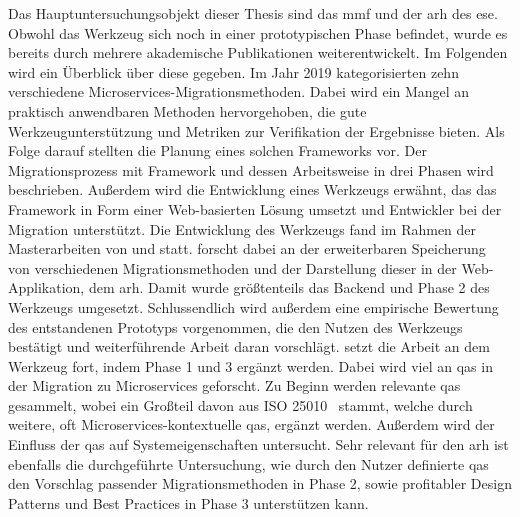 Das Hauptuntersuchungsobjekt dieser Thesis sind das \gls{mmf} und der \gls{arh} des \gls{ese}.
Obwohl das Werkzeug sich noch in einer prototypischen Phase befindet, wurde es bereits durch mehrere akademische Publikationen weiterentwickelt.
Im Folgenden wird ein Überblick über diese gegeben.
Im Jahr 2019 kategorisierten  zehn verschiedene Microservices-Migrationsmethoden.
Dabei wird ein Mangel an praktisch anwendbaren Methoden hervorgehoben, die gute Werkzeugunterstützung und Metriken zur Verifikation der Ergebnisse bieten.
Als Folge darauf stellten  die Planung eines solchen Frameworks vor.
Der Migrationsprozess mit Framework und dessen Arbeitsweise in drei Phasen wird beschrieben.
Außerdem wird die Entwicklung eines Werkzeugs erwähnt, das das Framework in Form einer Web-basierten Lösung umsetzt und Entwickler bei der Migration unterstützt.
Die Entwicklung des Werkzeugs fand im Rahmen der Masterarbeiten von  und  statt.
\citeauthor{master-tobias-haller} forscht dabei an der erweiterbaren Speicherung von verschiedenen Migrationsmethoden und der Darstellung dieser in der Web-Applikation, dem \gls{arh}.
Damit wurde größtenteils das Backend und Phase 2 des Werkzeugs umgesetzt.
Schlussendlich wird außerdem eine empirische Bewertung des entstandenen Prototyps vorgenommen, die den Nutzen des Werkzeugs bestätigt und weiterführende Arbeit daran vorschlägt.
 setzt die Arbeit an dem Werkzeug fort, indem Phase 1 und 3 ergänzt werden.
Dabei wird viel an \glspl{qa} in der Migration zu Microservices geforscht.
Zu Beginn werden relevante \glspl{qa} gesammelt, wobei ein Großteil davon aus ISO 25010~\cite{ISO-25010} stammt, welche durch weitere, oft Microservices-kontextuelle \glspl{qa}, ergänzt werden.
Außerdem wird der Einfluss der \glspl{qa} auf Systemeigenschaften untersucht.
Sehr relevant für den \gls{arh} ist ebenfalls die durchgeführte Untersuchung, wie durch den Nutzer definierte \glspl{qa} den Vorschlag passender Migrationsmethoden in Phase 2, sowie profitabler Design Patterns und Best Practices in Phase 3 unterstützen kann.


